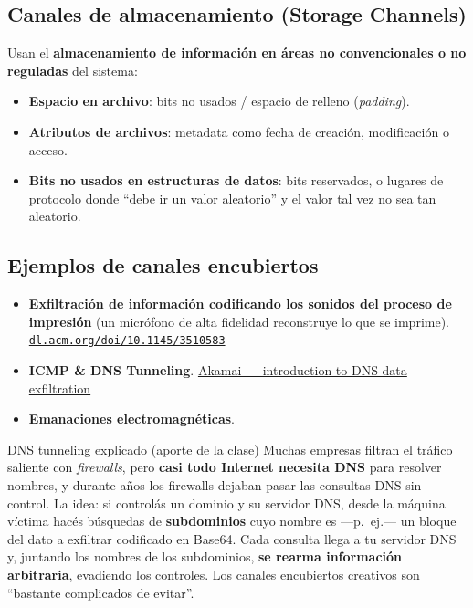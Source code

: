 \documentclass[11pt,a4paper]{article}
\begin{document}
\subsection{Canales de almacenamiento (Storage Channels)}
Usan el \textbf{almacenamiento de información en áreas no convencionales o no reguladas} del
sistema:
\begin{itemize}[leftmargin=1.4em,itemsep=1pt]
  \item \textbf{Espacio en archivo}: bits no usados / espacio de relleno (\emph{padding}).
  \item \textbf{Atributos de archivos}: metadata como fecha de creación, modificación o acceso.
  \item \textbf{Bits no usados en estructuras de datos}: bits reservados, o lugares de protocolo
        donde ``debe ir un valor aleatorio'' y el valor tal vez no sea tan aleatorio.
\end{itemize}

\subsection{Ejemplos de canales encubiertos}
\begin{slidebox}
\begin{itemize}[leftmargin=1.4em,itemsep=2pt]
  \item \textbf{Exfiltración de información codificando los sonidos del proceso de impresión}
        (un micrófono de alta fidelidad reconstruye lo que se imprime).
        \href{https://dl.acm.org/doi/10.1145/3510583}{\texttt{dl.acm.org/doi/10.1145/3510583}}
  \item \textbf{ICMP \& DNS Tunneling}.
        \href{https://www.akamai.com/blog/news/introduction-to-dns-data-exfiltration}{Akamai —
        introduction to DNS data exfiltration}
  \item \textbf{Emanaciones electromagnéticas}.
\end{itemize}
\end{slidebox}

\begin{practbox}{DNS tunneling explicado (aporte de la clase)}
Muchas empresas filtran el tráfico saliente con \emph{firewalls}, pero \textbf{casi todo
Internet necesita DNS} para resolver nombres, y durante años los firewalls dejaban pasar las
consultas DNS sin control. La idea: si controlás un dominio y su servidor DNS, desde la máquina
víctima hacés búsquedas de \textbf{subdominios} cuyo nombre es —p.\ ej.— un bloque del dato a
exfiltrar codificado en Base64. Cada consulta llega a tu servidor DNS y, juntando los nombres de
los subdominios, \textbf{se rearma información arbitraria}, evadiendo los controles. Los canales
encubiertos creativos son ``bastante complicados de evitar''.
\end{practbox}
\end{document}
